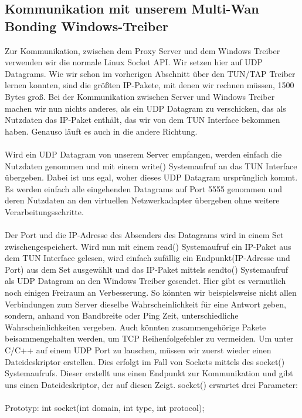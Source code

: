 \subsection{Kommunikation mit unserem Multi-Wan Bonding Windows-Treiber}
Zur Kommunikation, zwischen dem Proxy Server und dem Windows Treiber verwenden wir die normale Linux Socket API. Wir setzen hier auf UDP Datagrams. Wie wir schon im vorherigen Abschnitt über den TUN/TAP Treiber lernen konnten, sind die größten IP-Pakete, mit denen wir rechnen müssen, 1500 Bytes groß. Bei der Kommunikation zwischen Server und Windows Treiber machen wir nun nichts anderes, als ein UDP Datagram zu verschicken, das als Nutzdaten das IP-Paket enthält, das wir von dem TUN Interface bekommen haben. Genauso läuft es auch in die andere Richtung. 
\\\\
Wird ein UDP Datagram von unserem Server empfangen, werden einfach die Nutzdaten genommen und mit einem write() Systemaufruf an das TUN Interface übergeben. Dabei ist uns egal, woher dieses UDP Datagram ursprünglich kommt. Es werden einfach alle eingehenden Datagrams auf Port 5555 genommen und deren Nutzdaten an den virtuellen Netzwerkadapter übergeben ohne weitere Verarbeitungsschritte. 
\\\\
Der Port und die IP-Adresse des Absenders des Datagrams wird in einem Set zwischengespeichert. Wird nun mit einem read() Systemaufruf ein IP-Paket aus dem TUN Interface gelesen, wird einfach zufällig ein Endpunkt(IP-Adresse und Port) aus dem Set ausgewählt und das IP-Paket mittels sendto() Systemaufruf als UDP Datagram an den Windows Treiber gesendet. Hier gibt es vermutlich noch einigen Freiraum an Verbesserung. So könnten wir beispielsweise nicht allen Verbindungen zum Server dieselbe Wahrscheinlichkeit für eine Antwort geben, sondern, anhand von Bandbreite oder Ping Zeit, unterschiedliche Wahrscheinlichkeiten vergeben. Auch könnten zusammengehörige Pakete beisammengehalten werden, um TCP Reihenfolgefehler zu vermeiden.
\newpage
Um unter C/C++ auf einem UDP Port zu lauschen, müssen wir zuerst wieder einen Dateideskriptor erstellen. Dies erfolgt im Fall von Sockets mittels des socket() Systemaufrufs. Dieser erstellt uns einen Endpunkt zur Kommunikation und gibt uns einen Dateideskriptor, der auf diesen Zeigt. socket() erwartet drei Parameter:
\\\\
Prototyp: int socket(int domain, int type, int protocol);
